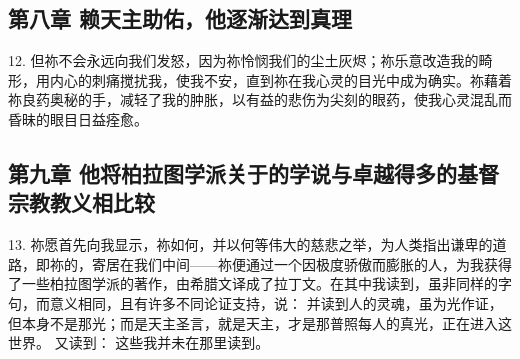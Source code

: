
\subsection{第八章 赖天主助佑，他逐渐达到真理}

12.  但祢不会永远向我们发怒，因为祢怜悯我们的尘土灰烬；祢乐意改造我的畸形，用内心的刺痛搅扰我，使我不安，直到祢在我心灵的目光中成为确实。祢藉着祢良药奥秘的手，减轻了我的肿胀，以有益的悲伤为尖刻的眼药，使我心灵混乱而昏昧的眼目日益痊愈。\par


\subsection{第九章 他将柏拉图学派关于的学说与卓越得多的基督宗教教义相比较}

13. 祢愿首先向我显示，祢如何，并以何等伟大的慈悲之举，为人类指出谦卑的道路，即祢的，寄居在我们中间——祢便通过一个因极度骄傲而膨胀的人，为我获得了一些柏拉图学派的著作，由希腊文译成了拉丁文。在其中我读到，虽非同样的字句，而意义相同，且有许多不同论证支持，说： 并读到人的灵魂，虽为光作证，但本身不是那光；而是天主圣言，就是天主，才是那普照每人的真光，正在进入这世界。 又读到： 这些我并未在那里读到。\par

